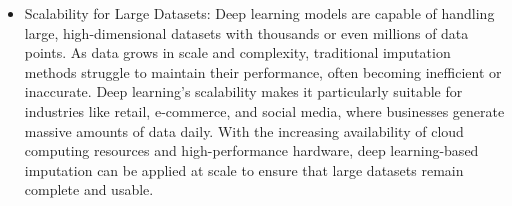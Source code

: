 \documentclass{article}
\begin{document}
\begin{itemize}
\item Scalability for Large Datasets:
Deep learning models are capable of handling large, high-dimensional datasets with thousands or even millions of data points. As data grows in scale and complexity, traditional imputation methods struggle to maintain their performance, often becoming inefficient or inaccurate. Deep learning’s scalability makes it particularly suitable for industries like retail, e-commerce, and social media, where businesses generate massive amounts of data daily. With the increasing availability of cloud computing resources and high-performance hardware, deep learning-based imputation can be applied at scale to ensure that large datasets remain complete and usable.
\end{itemize}
	

	
\end{document}
